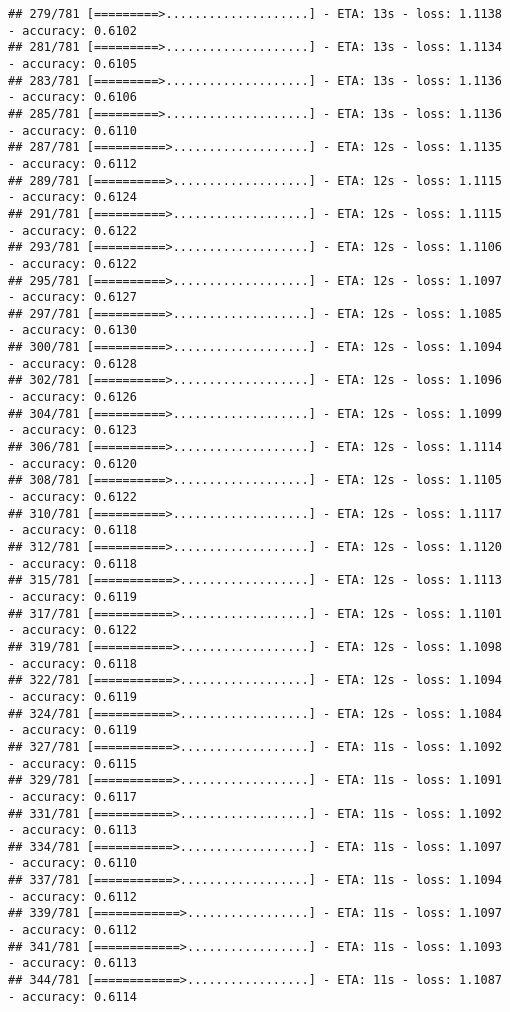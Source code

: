 \documentclass[
]{article}
\begin{document}
\begin{verbatim}
## 279/781 [=========>....................] - ETA: 13s - loss: 1.1138 - accuracy: 0.6102
## 281/781 [=========>....................] - ETA: 13s - loss: 1.1134 - accuracy: 0.6105
## 283/781 [=========>....................] - ETA: 13s - loss: 1.1136 - accuracy: 0.6106
## 285/781 [=========>....................] - ETA: 13s - loss: 1.1136 - accuracy: 0.6110
## 287/781 [==========>...................] - ETA: 12s - loss: 1.1135 - accuracy: 0.6112
## 289/781 [==========>...................] - ETA: 12s - loss: 1.1115 - accuracy: 0.6124
## 291/781 [==========>...................] - ETA: 12s - loss: 1.1115 - accuracy: 0.6122
## 293/781 [==========>...................] - ETA: 12s - loss: 1.1106 - accuracy: 0.6122
## 295/781 [==========>...................] - ETA: 12s - loss: 1.1097 - accuracy: 0.6127
## 297/781 [==========>...................] - ETA: 12s - loss: 1.1085 - accuracy: 0.6130
## 300/781 [==========>...................] - ETA: 12s - loss: 1.1094 - accuracy: 0.6128
## 302/781 [==========>...................] - ETA: 12s - loss: 1.1096 - accuracy: 0.6126
## 304/781 [==========>...................] - ETA: 12s - loss: 1.1099 - accuracy: 0.6123
## 306/781 [==========>...................] - ETA: 12s - loss: 1.1114 - accuracy: 0.6120
## 308/781 [==========>...................] - ETA: 12s - loss: 1.1105 - accuracy: 0.6122
## 310/781 [==========>...................] - ETA: 12s - loss: 1.1117 - accuracy: 0.6118
## 312/781 [==========>...................] - ETA: 12s - loss: 1.1120 - accuracy: 0.6118
## 315/781 [===========>..................] - ETA: 12s - loss: 1.1113 - accuracy: 0.6119
## 317/781 [===========>..................] - ETA: 12s - loss: 1.1101 - accuracy: 0.6122
## 319/781 [===========>..................] - ETA: 12s - loss: 1.1098 - accuracy: 0.6118
## 322/781 [===========>..................] - ETA: 12s - loss: 1.1094 - accuracy: 0.6119
## 324/781 [===========>..................] - ETA: 12s - loss: 1.1084 - accuracy: 0.6119
## 327/781 [===========>..................] - ETA: 11s - loss: 1.1092 - accuracy: 0.6115
## 329/781 [===========>..................] - ETA: 11s - loss: 1.1091 - accuracy: 0.6117
## 331/781 [===========>..................] - ETA: 11s - loss: 1.1092 - accuracy: 0.6113
## 334/781 [===========>..................] - ETA: 11s - loss: 1.1097 - accuracy: 0.6110
## 337/781 [===========>..................] - ETA: 11s - loss: 1.1094 - accuracy: 0.6112
## 339/781 [============>.................] - ETA: 11s - loss: 1.1097 - accuracy: 0.6112
## 341/781 [============>.................] - ETA: 11s - loss: 1.1093 - accuracy: 0.6113
## 344/781 [============>.................] - ETA: 11s - loss: 1.1087 - accuracy: 0.6114

\end{verbatim}
\end{document}
